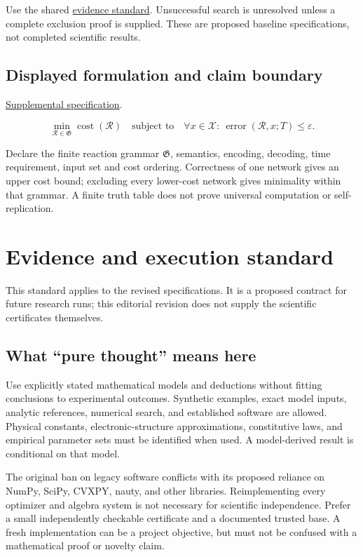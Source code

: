 \documentclass[
  11pt,
]{article}
\begin{document}
Use the shared
\href{https://github.com/rick-stevens-ai/Pure-Thought/blob/main/reviews/EVIDENCE-STANDARD.md}{evidence
standard}. Unsuccessful search is unresolved unless a complete exclusion
proof is supplied. These are proposed baseline specifications, not
completed scientific results.

\subsection{Displayed formulation and claim boundary}

\href{https://github.com/rick-stevens-ai/Pure-Thought/blob/main/supplemental/S11.md}{Supplemental
specification}.

\[\min_{\mathcal R\in\mathfrak G}\operatorname{cost}(\mathcal R)
\quad\text{subject to}\quad
\forall x\in\mathcal X:\ \operatorname{error}(\mathcal R,x;T)\le\varepsilon.\]

Declare the finite reaction grammar \(\mathfrak G\), semantics,
encoding, decoding, time requirement, input set and cost ordering.
Correctness of one network gives an upper cost bound; excluding every
lower-cost network gives minimality within that grammar. A finite truth
table does not prove universal computation or self-replication.

\section{Evidence and execution standard}

This standard applies to the revised specifications. It is a proposed
contract for future research runs; this editorial revision does not
supply the scientific certificates themselves.

\subsection{What ``pure thought'' means here}

Use explicitly stated mathematical models and deductions without fitting
conclusions to experimental outcomes. Synthetic examples, exact model
inputs, analytic references, numerical search, and established software
are allowed. Physical constants, electronic-structure approximations,
constitutive laws, and empirical parameter sets must be identified when
used. A model-derived result is conditional on that model.

The original ban on legacy software conflicts with its proposed reliance
on NumPy, SciPy, CVXPY, nauty, and other libraries. Reimplementing every
optimizer and algebra system is not necessary for scientific
independence. Prefer a small independently checkable certificate and a
documented trusted base. A fresh implementation can be a project
objective, but must not be confused with a mathematical proof or novelty
claim.
\end{document}
